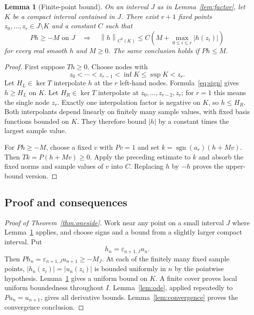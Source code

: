 \documentclass[11pt,reqno]{amsart}
\numberwithin{equation}{section}
\newtheorem{lemma}[theorem]{Lemma}
\theoremstyle{definition}
\theoremstyle{remark}
\newcommand{\sgn}{\operatorname{sgn}}
\newcommand{\norm}[1]{\left\lVert #1\right\rVert}
\begin{document}
\begin{lemma}[Finite-point bound]\label{lem:finitepoint}
On an interval $J$ as in Lemma~\ref{lem:factor}, let $K$ be a compact interval contained in $J$. There exist $r+1$ fixed points $z_0,\ldots,z_r\in J\setminus K$ and a constant $C$ such that
\begin{equation}\label{eq:finitepoint}
 Ph\ge-M\text{ on }J
 \quad\Longrightarrow\quad
 \norm{h}_{C^0(K)}\le C\left(M+\max_{0\le i\le r}|h(z_i)|\right)
\end{equation}
for every real smooth $h$ and $M\ge0$. The same conclusion holds if $Ph\le M$.
\end{lemma}
\begin{proof}
First suppose $Th\ge0$. Choose nodes with
\[
 z_0<\cdots<z_{r-1}<\inf K\le\sup K<z_r.
\]
Let $H_L\in\ker T$ interpolate $h$ at the $r$ left-hand nodes. Formula~\eqref{eq:sign} gives $h\ge H_L$ on $K$. Let $H_R\in\ker T$ interpolate at $z_0,\ldots,z_{r-2},z_r$; for $r=1$ this means the single node $z_r$. Exactly one interpolation factor is negative on $K$, so $h\le H_R$. Both interpolants depend linearly on finitely many sample values, with fixed basis functions bounded on $K$. They therefore bound $|h|$ by a constant times the largest sample value.

For $Ph\ge-M$, choose a fixed $v$ with $Pv=1$ and set $k=\sgn(a_r)(h+Mv)$. Then $Tk=P(h+Mv)\ge0$. Apply the preceding estimate to $k$ and absorb the fixed norms and sample values of $v$ into $C$. Replacing $h$ by $-h$ proves the upper-bound version.
\end{proof}

\subsection{Proof and consequences}
\begin{proof}[Proof of Theorem~\ref{thm:oneside}]
Work near any point on a small interval $J$ where Lemma~\ref{lem:finitepoint} applies, and choose signs and a bound from a slightly larger compact interval. Put
\[
 h_n=\varepsilon_{n+1,J}u_n.
\]
Then $Ph_n=\varepsilon_{n+1,J}u_{n+1}\ge-M_J$. At each of the finitely many fixed sample points, $|h_n(z_i)|=|u_n(z_i)|$ is bounded uniformly in $n$ by the pointwise hypothesis. Lemma~\ref{lem:finitepoint} gives a uniform bound on $K$. A finite cover proves local uniform boundedness throughout $I$. Lemma~\ref{lem:ode}, applied repeatedly to $Pu_n=u_{n+1}$, gives all derivative bounds. Lemma~\ref{lem:convergence} proves the convergence conclusion.
\end{proof}
\end{document}
